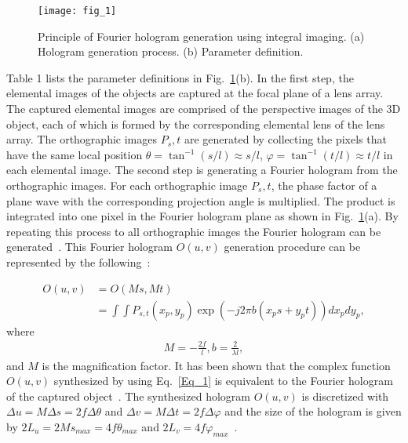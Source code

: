 \documentclass[10pt,letterpaper]{article}
\begin{document}
\begin{figure}[!htp]
\centering
\texttt{[image: fig\_1]}
\caption{Principle of Fourier hologram generation using integral imaging. (a) Hologram generation process. (b) Parameter definition.}
\label{fig_1}
\end{figure}
Table 1 lists the parameter definitions in Fig.~\ref{fig_1}(b). In the first step, the elemental images of the objects are captured at the focal plane of a lens array. The captured elemental images are comprised of the perspective images of the 3D object, each of which is formed by the corresponding elemental lens of the lens array. The orthographic images $P_s,t$ are generated by collecting the pixels that have the same local position $\theta=\tan^{-1}(s/l)\approx s/l$, $\varphi=\tan^{-1}(t/l)\approx t/l$ in each elemental image. The second step is generating a Fourier hologram from the orthographic images. For each orthographic image $P_s,t$, the phase factor of a plane wave with the corresponding projection angle is multiplied. The product is integrated into one pixel in the Fourier hologram plane as shown in Fig.~\ref{fig_1}(a). By repeating this process to all orthographic images the Fourier hologram can be generated~\cite{Park_2009_OE}. This Fourier hologram $O(u,v)$ generation procedure can be represented by the following~\cite{Park_2009_OE}: 

\begin{align}
O(u,v)
&=O(Ms,Mt) \nonumber\\ 
&=\int\int P_{s,t}(x_p, y_p)\exp(-j2\pi b(x_p s+y_p t)) dx_p dy_p, 
\label{Eq_1} 
\end{align} 
where 
\begin{align}
M=-\frac{2f}{l}, b=\frac{2}{\lambda l} , 
\label{Eq_2} 
\end{align} 
and $M$ is the magnification factor. It has been shown that the complex function $O(u,v)$ synthesized by using Eq.~\eqref{Eq_1} is equivalent to the Fourier hologram of the captured object~\cite{Park_2009_OE}. The synthesized hologram $O(u,v)$ is discretized with $\Delta u =M\Delta s=2f\Delta\theta$ and $\Delta v= M \Delta t=2f\Delta\varphi$ and the size of the hologram is given by $2L_u=2Ms_{max}=4f\theta_{max}$ and $2L_v=4f\varphi_{max}$~\cite{Kishk_2003_OE}.
\end{document}
